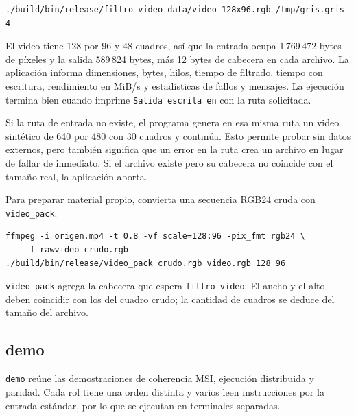 \begin{lstlisting}
./build/bin/release/filtro_video data/video_128x96.rgb /tmp/gris.gris 4
\end{lstlisting}

El video tiene 128 por 96 y 48 cuadros, así que la entrada ocupa 1\,769\,472 bytes de píxeles y la salida 589\,824 bytes, más 12 bytes de cabecera en cada archivo. La aplicación informa dimensiones, bytes, hilos, tiempo de filtrado, tiempo con escritura, rendimiento en MiB/s y estadísticas de fallos y mensajes. La ejecución termina bien cuando imprime \texttt{Salida escrita en} con la ruta solicitada.

Si la ruta de entrada no existe, el programa genera en esa misma ruta un video sintético de 640 por 480 con 30 cuadros y continúa. Esto permite probar sin datos externos, pero también significa que un error en la ruta crea un archivo en lugar de fallar de inmediato. Si el archivo existe pero su cabecera no coincide con el tamaño real, la aplicación aborta.

Para preparar material propio, convierta una secuencia RGB24 cruda con \texttt{video\_pack}:

\begin{lstlisting}
ffmpeg -i origen.mp4 -t 0.8 -vf scale=128:96 -pix_fmt rgb24 \
    -f rawvideo crudo.rgb
./build/bin/release/video_pack crudo.rgb video.rgb 128 96
\end{lstlisting}

\texttt{video\_pack} agrega la cabecera que espera \texttt{filtro\_video}. El ancho y el alto deben coincidir con los del cuadro crudo; la cantidad de cuadros se deduce del tamaño del archivo.

\subsection{demo}\label{subsec:demo}

\texttt{demo} reúne las demostraciones de coherencia MSI, ejecución distribuida y paridad. Cada rol tiene una orden distinta y varios leen instrucciones por la entrada estándar, por lo que se ejecutan en terminales separadas.

